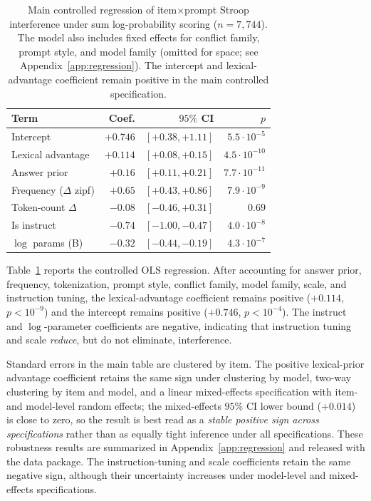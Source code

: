 \documentclass[11pt]{article}
\begin{document}
\begin{table}[t]
\centering
\scriptsize
\setlength{\tabcolsep}{3pt}
\begin{tabular*}{\columnwidth}{@{\extracolsep{\fill}}lrrr@{}}
\toprule
Term & Coef. & $95\%$ CI & $p$ \\
\midrule
Intercept                 & $+0.746$ & $[+0.38, +1.11]$ & $5.5{\cdot}10^{-5}$ \\
Lexical advantage         & $+0.114$ & $[+0.08, +0.15]$ & $4.5{\cdot}10^{-10}$ \\
Answer prior              & $+0.16$ & $[+0.11, +0.21]$ & $7.7{\cdot}10^{-11}$ \\
Frequency ($\Delta$ zipf) & $+0.65$ & $[+0.43, +0.86]$ & $7.9{\cdot}10^{-9}$ \\
Token-count $\Delta$      & $-0.08$ & $[-0.46, +0.31]$ & $0.69$ \\
Is instruct               & $-0.74$ & $[-1.00, -0.47]$ & $4.0{\cdot}10^{-8}$ \\
$\log$ params (B)         & $-0.32$ & $[-0.44, -0.19]$ & $4.3{\cdot}10^{-7}$ \\
\bottomrule
\end{tabular*}
\caption{Main controlled regression of item$\times$prompt Stroop interference under sum
log-probability scoring ($n{=}7{,}744$). The model also includes fixed effects for conflict
family, prompt style, and model family (omitted for space; see Appendix~\ref{app:regression}).
The intercept and lexical-advantage coefficient remain positive in the main controlled
specification.}
\label{tab:regression}
\end{table}

Table~\ref{tab:regression} reports the controlled OLS regression.
After accounting for answer prior, frequency, tokenization, prompt style, conflict family,
model family, scale, and instruction tuning, the lexical-advantage coefficient remains positive
($+0.114$, $p < 10^{-9}$) and the intercept remains positive ($+0.746$, $p < 10^{-4}$).
The instruct and $\log$-parameter coefficients are negative, indicating that instruction tuning
and scale \emph{reduce}, but do not eliminate, interference.

Standard errors in the main table are clustered by item. The positive lexical-prior advantage
coefficient retains the same sign under clustering by model, two-way clustering by item and
model, and a linear mixed-effects specification with item- and model-level random effects; the
mixed-effects $95\%$ CI lower bound ($+0.014$) is close to zero, so the result is best read as a
\emph{stable positive sign across specifications} rather than as equally tight inference under
all specifications. These robustness results are summarized in Appendix~\ref{app:regression} and
released with the data package. The instruction-tuning and scale coefficients retain the same
negative sign, although their uncertainty increases under model-level and mixed-effects
specifications.
\end{document}
